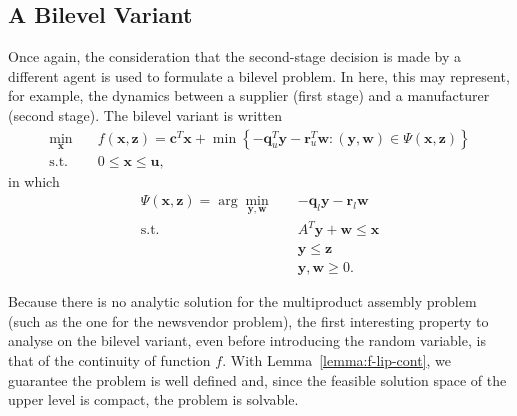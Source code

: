 \documentclass[12pt]{article}
\begin{document}
\subsection*{A Bilevel Variant}

Once again, the consideration that the second-stage decision is made by a different agent is used to formulate a bilevel problem.
In here, this may represent, for example, the dynamics between a supplier (first stage) and a manufacturer (second stage).
The bilevel variant is written
\begin{equation}\label{eq:multiproduct-ul}
\begin{split}
    \min_{\bm{x}} \quad & f(\bm{x},\bm{z}) = \bm{c}^{T}\bm{x} + \min\left\{ -\bm{q}^{T}_u \bm{y} -\bm{r}^{T}_u \bm{w} : (\bm{y},\bm{w})\in \Psi(\bm{x},\bm{z}) \right\}  \\
    \textrm{s.t.} \quad & 0\le \bm{x}\le \bm{u}
,\end{split}
\end{equation}
in which
\begin{equation}\label{eq:multiproduct-ll}
\begin{split}
    \Psi(\bm{x},\bm{z}) = \arg\min_{\bm{y},\bm{w}} \quad & -\bm{q}_l \bm{y} - \bm{r}_l \bm{w} \\
    \textrm{s.t.} \quad & A^{T}\bm{y}+\bm{w} \le \bm{x} \\
      & \bm{y}\le \bm{z} \\
      & \bm{y},\bm{w} \ge 0
.\end{split}
\end{equation}


Because there is no analytic solution for the multiproduct assembly problem (such as the one for the newsvendor problem), the first interesting property to analyse on the bilevel variant, even before introducing the random variable, is that of the continuity of function $f$.
With Lemma~\ref{lemma:f-lip-cont}, we guarantee the problem is well defined and, since the feasible solution space of the upper level is compact, the problem is solvable.
\end{document}
